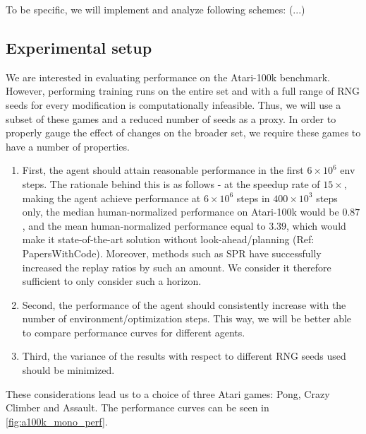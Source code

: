 \documentclass[twoside,11pt]{article}
\begin{document}
To be specific, we will implement and analyze following schemes: (...)

\subsection{Experimental setup}

We are interested in evaluating performance on the Atari-100k benchmark. However, performing training runs on the entire set and with a full range of RNG seeds for every modification is computationally infeasible. Thus, we will use a subset of these games and a reduced number of seeds as a proxy. In order to properly gauge the effect of changes on the broader set, we require these games to have a number of properties.

\begin{enumerate}
  \item First, the agent should attain reasonable performance in the first $6 \times 10^6$ env steps. The rationale behind this is as follows - at the speedup rate of $15\times$, making the agent achieve performance at $6 \times 10^6$ steps in $400 \times 10^3$ steps only, the median human-normalized performance on Atari-100k would be $0.87$, and the mean human-normalized performance equal to $3.39$, which would make it state-of-the-art solution without look-ahead/planning (Ref: PapersWithCode). Moreover, methods such as SPR have successfully increased the replay ratios by such an amount. We consider it therefore sufficient to only consider such a horizon.
  \item Second, the performance of the agent should consistently increase with the number of environment/optimization steps. This way, we will be better able to compare performance curves for different agents.
  \item Third, the variance of the results with respect to different RNG seeds used should be minimized.
\end{enumerate}

These considerations lead us to a choice of three Atari games: Pong, Crazy Climber and Assault. The performance curves can be seen in \autoref{fig:a100k_mono_perf}.
\end{document}
